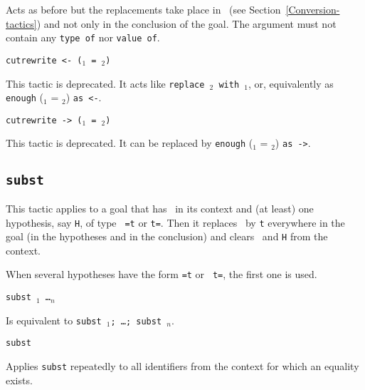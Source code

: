 \begin{coq_example*}
\begin{Variants}
    Acts as before but the replacements take place in
    ~(see Section~\ref{Conversion-tactics}) and not only
    in the conclusion of the goal.
    The  argument must not contain any \texttt{type of} nor \texttt{value of}.

\item {\tt cutrewrite <- (\term$_1$ = \term$_2$)}

This tactic is deprecated. It acts like {\tt replace {\term$_2$} with
  {\term$_1$}}, or, equivalently as {\tt enough} (\term$_1$ =
\term$_2$) {\tt as <-}.

\item {\tt cutrewrite -> (\term$_1$ = \term$_2$)}

This tactic is deprecated. It can be replaced by {\tt enough}
(\term$_1$ = \term$_2$) {\tt as ->}.

\end{Variants}

\subsection{\tt subst \ident}

This tactic applies to a goal that has \ident\ in its context and
(at least) one hypothesis, say {\tt H}, of type {\tt
  \ident=t} or {\tt t=\ident}. Then it replaces
\ident\ by {\tt t} everywhere in the goal (in the hypotheses
and in the conclusion) and clears \ident\ and {\tt H} from the context.

\Rem
When several hypotheses have the form {\tt \ident=t} or {\tt
  t=\ident}, the first one is used.

\begin{Variants}
  \item {\tt subst \ident$_1$ \dots \ident$_n$}

    Is equivalent to {\tt subst \ident$_1$; \dots; subst \ident$_n$}.
  \item {\tt subst}

    Applies {\tt subst} repeatedly to all identifiers from the context
    for which an equality exists.


\end{Variants}
\end{coq_example*}
